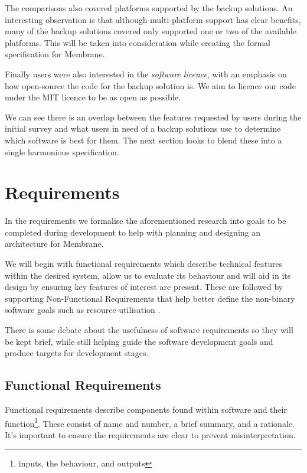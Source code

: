 \documentclass[11pt, a4paper, twoside]{report}
\begin{document}
The comparisons also covered platforms supported by the backup solutions. An interesting observation is that although multi-platform support has clear benefits, many of the backup solutions covered only supported one or two of the available platforms. This will be taken into consideration while creating the formal specification for Membrane.

Finally users were also interested in the \emph{software licence}, with an emphasis on how open-source the code for the backup solution is. We aim to licence our code under the MIT licence to be as open as possible.

We can see there is an overlap between the features requested by users during the initial survey and what users in need of a backup solutions use to determine which software is best for them. The next section looks to blend these into a single harmonious specification.

\section{Requirements} \label{sec:requirements}

In the requirements we formalise the aforementioned research into goals to be completed during development to help with planning and designing an architecture for Membrane.

We will begin with functional requirements which describe technical features within the desired system, allow us to evaluate its behaviour and will aid in its design by ensuring key features of interest are present. \citep{van2009requirements} These are followed by supporting Non-Functional Requirements that help better define the non-binary software goals such as resource utilisation \cite{chung2012non}.

There is some debate about the usefulness of software requirements \cite{kneuper1997limits} so they will be kept brief, while still helping guide the software development goals and produce targets for development stages.

\subsection{Functional Requirements}

Functional requirements describe components found within software and their function\footnote{inputs, the behaviour, and outputs}. These consist of name and number, a brief summary, and a rationale. It's important to ensure the requirements are clear to prevent misinterpretation.
\end{document}
